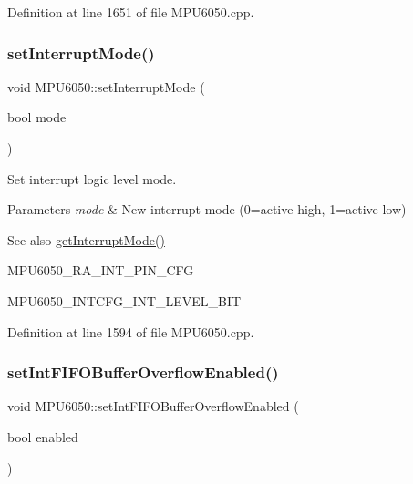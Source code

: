 Definition at line 1651 of file M\+P\+U6050.\+cpp.

\mbox{\label{classMPU6050_a003a098a1521c5ef4df50c0a8a2d47ab}} 
\subsubsection{\texorpdfstring{setInterruptMode()}{setInterruptMode()}}
{\footnotesize\ttfamily void M\+P\+U6050\+::set\+Interrupt\+Mode (\begin{DoxyParamCaption}\item[{bool}]{mode }\end{DoxyParamCaption})}



Set interrupt logic level mode. 


\begin{DoxyParams}{Parameters}
{\em mode} & New interrupt mode (0=active-\/high, 1=active-\/low) \\
\hline
\end{DoxyParams}
\begin{DoxySeeAlso}{See also}
\mbox{\hyperlink{classMPU6050_a58da1dfb39eb34e3a09a9b0bf4d87f29}{get\+Interrupt\+Mode()}} 

M\+P\+U6050\+\_\+\+R\+A\+\_\+\+I\+N\+T\+\_\+\+P\+I\+N\+\_\+\+C\+FG 

M\+P\+U6050\+\_\+\+I\+N\+T\+C\+F\+G\+\_\+\+I\+N\+T\+\_\+\+L\+E\+V\+E\+L\+\_\+\+B\+IT 
\end{DoxySeeAlso}


Definition at line 1594 of file M\+P\+U6050.\+cpp.

\mbox{\label{classMPU6050_a83710a6b1e07f3b385239cc06f275cdb}} 
\subsubsection{\texorpdfstring{setIntFIFOBufferOverflowEnabled()}{setIntFIFOBufferOverflowEnabled()}}
{\footnotesize\ttfamily void M\+P\+U6050\+::set\+Int\+F\+I\+F\+O\+Buffer\+Overflow\+Enabled (\begin{DoxyParamCaption}\item[{bool}]{enabled }\end{DoxyParamCaption})}



